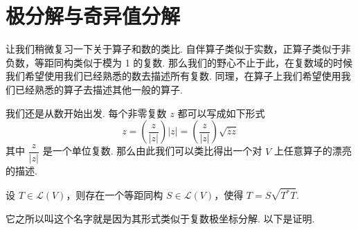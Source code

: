 \chapter{极分解与奇异值分解}

让我们稍微复习一下关于算子和数的类比. 自伴算子类似于实数，正算子类似于非负数，等距同构类似于模为 1 的复数. 那么我们的野心不止于此，在复数域的时候我们希望使用我们已经熟悉的数去描述所有复数. 同理，在算子上我们希望使用我们已经熟悉的算子去描述其他一般的算子.


我们还是从数开始出发. 每个非零复数 $ z $ 都可以写成如下形式
\[ z = \left(\frac{z}{\lvert z \rvert}\right)\lvert z \rvert = \left(\frac{z}{\lvert z \rvert}\right)\sqrt{\overline{z}z} \]
其中 $ \dfrac{z}{\lvert z \rvert} $ 是一个单位复数. 那么由此我们可以类比得出一个对 $ V $ 上任意算子的漂亮的描述.

\begin{theorem}
    设 $ T \in \mathcal{L}(V) $，则存在一个等距同构 $ S \in \mathcal{L}(V) $，使得 $ T = S\sqrt{T^*T} $.
\end{theorem}

它之所以叫这个名字就是因为其形式类似于复数极坐标分解. 以下是证明.

